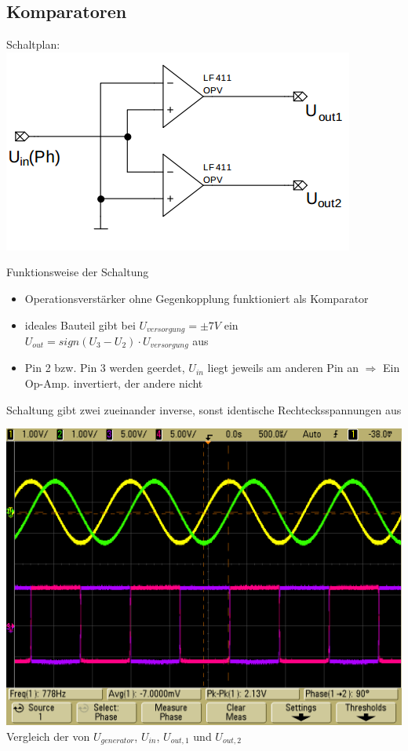 \documentclass[compress,11pt]{beamer}
\begin{document}
\subsection{Komparatoren}
\begin{frame}
Schaltplan:\\
\includegraphics[width=.7\textwidth]{schalt/komparator}
\end{frame}
\begin{frame}
\begin{block}{Funktionsweise der Schaltung}
\begin{itemize}
\item Operationsverstärker ohne Gegenkopplung funktioniert als Komparator
\item ideales Bauteil gibt bei $U_{versorgung} = \pm 7 V$ ein $U_{out} = sign(U_3 - U_2) \cdot U_{versorgung}$ aus
\item Pin 2 bzw. Pin 3 werden geerdet, $U_{in}$ liegt jeweils am anderen Pin an $\Rightarrow$ Ein Op-Amp. invertiert, der andere nicht
\end{itemize}
\end{block}
Schaltung gibt zwei zueinander inverse, sonst identische Rechtecksspannungen aus
\end{frame}
\begin{frame}
\includegraphics[width=.7\textwidth]{../oszi/scope_5}\\
Vergleich der von $U_{generator}$, $U_{in}$, $U_{out,1}$ und $U_{out,2}$
\end{frame}
\end{document}
